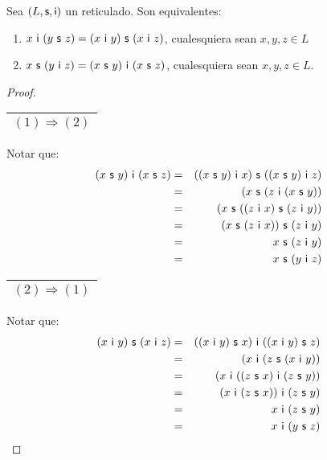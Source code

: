   \begin{lemma} \label{lemma_20}
    \PN Sea $(L, \mathsf{s}, \mathsf{i})$ un reticulado. Son equivalentes:
    \begin{enumerate}[(1)]
      \item $x \ \IN \ (y \ \SU \ z) = (x \ \IN \ y) \ \SU \ (x \ \IN \ z)$, cualesquiera sean $x, y, z \in L$
      \item $x \ \SU \ (y \ \IN \ z) = (x \ \SU \ y) \ \IN \ (x \ \SU \ z)$, cualesquiera sean $x, y, z \in L$.
    \end{enumerate}
  \end{lemma}
  \begin{proof}
    \PN \begin{tabular}{|c|} \hline $(1) \Rightarrow (2)$ \\\hline \end{tabular} Notar que:
    \begin{eqnarray*}
      (x \ \SU \ y) \ \IN \ (x \ \SU \ z) &=& ((x \ \SU \ y) \ \IN \ x) \ \SU \ ((x \ \SU \ y) \ \IN \ z) \\
      &=& (x \ \SU \ (z \ \IN \ (x \ \SU \ y)) \\
      &=& (x \ \SU \ ((z \ \IN \ x) \ \SU \ (z \ \IN \ y)) \\
      &=& (x \ \SU \ (z \ \IN \ x)) \ \SU \ (z \ \IN \ y) \\
      &=& x \ \SU \ (z \ \IN \ y) \\
      &=& x \ \SU \ (y \ \IN \ z)
    \end{eqnarray*}

    \PN \begin{tabular}{|c|} \hline $(2) \Rightarrow (1)$ \\\hline \end{tabular} Notar que:
    \begin{eqnarray*}
      (x \ \IN \ y) \ \SU \ (x \ \IN \ z) &=& ((x \ \IN \ y) \ \SU \ x) \ \IN \ ((x \ \IN \ y) \ \SU \ z) \\
      &=& (x \ \IN \ (z \ \SU \ (x \ \IN \ y)) \\
      &=& (x \ \IN \ ((z \ \SU \ x) \ \IN \ (z \ \SU \ y)) \\
      &=& (x \ \IN \ (z \ \SU \ x)) \ \IN \ (z \ \SU \ y) \\
      &=& x \ \IN \ (z \ \SU \ y) \\
      &=& x \ \IN \ (y \ \SU \ z)
    \end{eqnarray*}
  \end{proof}

